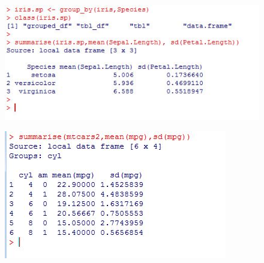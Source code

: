 \documentclass{beamer}
\begin{document}
\begin{frame}
\begin{figure}
\centering
\includegraphics[width=1.05\linewidth]{irisgroupby}
\end{figure}
\end{frame}	

\begin{frame}
\begin{figure}
\centering
\includegraphics[width=1.1\linewidth]{mtcarssummarise}
\label{fig:mtcarssummarise}
\end{figure}
\end{frame}
		
\end{document}
